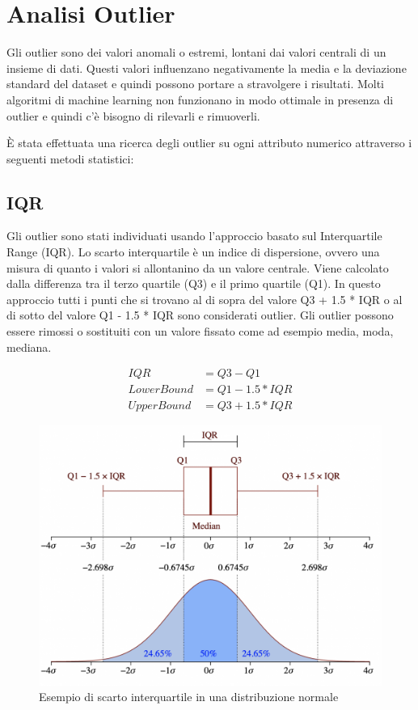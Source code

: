 \section{Analisi Outlier}
Gli outlier sono dei valori anomali o estremi, lontani dai valori centrali di un insieme di dati. 
Questi valori influenzano negativamente la media e la deviazione standard del dataset e quindi possono portare a stravolgere i risultati.
Molti algoritmi di machine learning non funzionano in modo ottimale in presenza di outlier e quindi c'è bisogno di rilevarli e rimuoverli.

\vspace{4mm}
\noindent
\`{E} stata effettuata una ricerca degli outlier su ogni attributo numerico attraverso i seguenti metodi statistici:

\subsection{IQR}
Gli outlier sono stati individuati usando l'approccio basato sul Interquartile Range (IQR). Lo scarto interquartile è un indice di dispersione, ovvero una misura di quanto i valori si allontanino da un valore centrale. Viene calcolato dalla differenza tra il terzo quartile (Q3) e il primo quartile (Q1). In questo approccio tutti i punti che si trovano al di sopra del valore Q3 + 1.5 * IQR o al di sotto del valore Q1 - 1.5 * IQR sono considerati outlier. Gli outlier possono essere rimossi o sostituiti con un valore fissato come ad esempio media, moda, mediana.

\begin{align*}
    IQR         & = Q3 - Q1        \\
    Lower Bound & = Q1 - 1.5 * IQR \\
    Upper Bound & = Q3 + 1.5 * IQR
\end{align*}

\newpage

\begin{figure}
    \centering
    \includegraphics[width=.8\textwidth]{images/IQR.png}
    \caption{Esempio di scarto interquartile in una distribuzione normale \cite{wikipedia:iqr}}
    \label{fig:iqr}
\end{figure}


